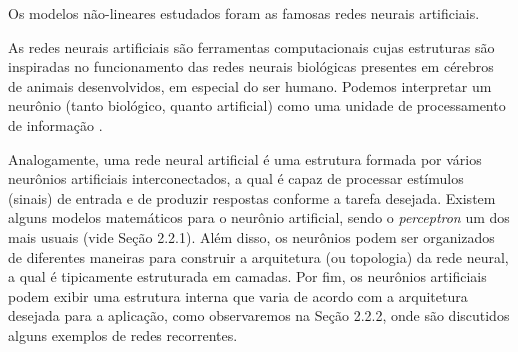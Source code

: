\documentclass[a4paper, 12pt]{article}
\begin{document}
Os modelos não-lineares estudados foram as famosas redes neurais artificiais.

As redes neurais artificiais são ferramentas computacionais cujas estruturas são inspiradas no funcionamento das redes neurais biológicas presentes em cérebros de animais desenvolvidos, em especial do ser humano. Podemos interpretar um neurônio (tanto biológico, quanto artificial) como uma unidade de processamento de informação \cite{haykin2010neural}. 

Analogamente, uma rede neural artificial é uma estrutura formada por vários neurô\-nios artificiais interconectados, a qual é capaz de processar estímulos (sinais) de entrada e de produzir respostas conforme a tarefa desejada. Existem alguns modelos matemáticos para o neurônio artificial, sendo o \textit{perceptron} um dos mais usuais (vide Seção 2.2.1). Além disso, os neurônios podem ser organizados de diferentes maneiras para construir a arquitetura (ou topologia) da rede neural, a qual é tipicamente estruturada em camadas. Por fim, os neurônios artificiais podem exibir uma estrutura interna que varia de acordo com a arquitetura desejada para a aplicação, como observaremos na Seção 2.2.2, onde são discutidos alguns exemplos de redes recorrentes.
\end{document}
